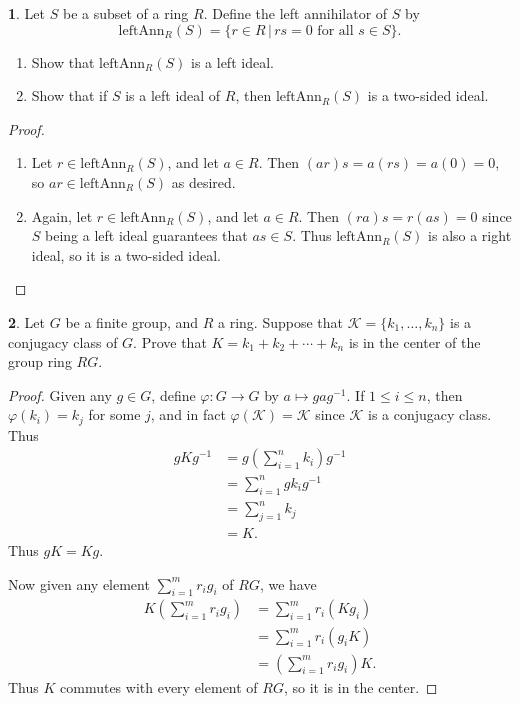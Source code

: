 \documentclass[12pt]{article}
\theoremstyle{definition}
\newtheorem{ex}{}
\begin{document}
\begin{ex}
	Let $S$ be a subset of a ring $R$.
	Define the left annihilator of $S$ by \begin{equation*}
		\mathrm{leftAnn}_R(S) = \lbrace r \in R \,|\, rs = 0 \text{ for all } s \in S \rbrace.
	\end{equation*}
	\begin{enumerate}[label=(\alph*)]
		\item Show that $\mathrm{leftAnn}_R(S)$ is a left ideal.
		\item Show that if $S$ is a left ideal of $R$, then $\mathrm{leftAnn}_R(S)$ is a two-sided ideal.
	\end{enumerate}
\end{ex}
\begin{proof}\
	\begin{enumerate}[label=(\alph*)]
		\item Let $r \in \mathrm{leftAnn}_R(S)$, and let $a \in R$.
		      Then $(ar)s = a(rs) = a(0) = 0$, so $ar \in \mathrm{leftAnn}_R(S)$ as desired.
		\item Again, let $r \in \mathrm{leftAnn}_R(S)$, and let $a \in R$.
		      Then $(ra)s = r(as) = 0$ since $S$ being a left ideal guarantees that $as \in S$.
		      Thus $\mathrm{leftAnn}_R(S)$ is also a right ideal, so it is a two-sided ideal.
	\end{enumerate}
\end{proof}

\begin{ex}
	Let $G$ be a finite group, and $R$ a ring.
	Suppose that $\mathcal{K} = \lbrace k_1, \dots, k_n \rbrace$ is a conjugacy class of $G$.
	Prove that $K = k_1 + k_2 + \cdots + k_n$ is in the center of the group ring $RG$.
\end{ex}
\begin{proof}
	Given any $g \in G$, define $\varphi : G \to G$ by $a \mapsto gag^{-1}$.
	If $1 \leq i \leq n$, then $\varphi(k_i) = k_j$ for some $j$, and in fact $\varphi(\mathcal{K})  = \mathcal{K}$ since $\mathcal{K}$ is a conjugacy class.
	Thus \begin{align*}
		gKg^{-1} & = g\left( \sum_{i=1}^n k_i \right)g^{-1} \\
		         & = \sum_{i=1}^n gk_ig^{-1}                \\
		         & = \sum_{j=1}^n k_j                       \\
		         & = K.
	\end{align*}
	Thus $gK = Kg$.

	Now given any element $\sum_{i=1}^m r_ig_i$ of $RG$, we have \begin{align*}
		K\left(\sum_{i=1}^m r_ig_i\right) & = \sum_{i=1}^m r_i(Kg_i)             \\
		                                  & = \sum_{i=1}^m r_i(g_iK)             \\
		                                  & = \left(\sum_{i=1}^m r_ig_i\right)K.
	\end{align*}
	Thus $K$ commutes with every element of $RG$, so it is in the center.
\end{proof}
\end{document}
